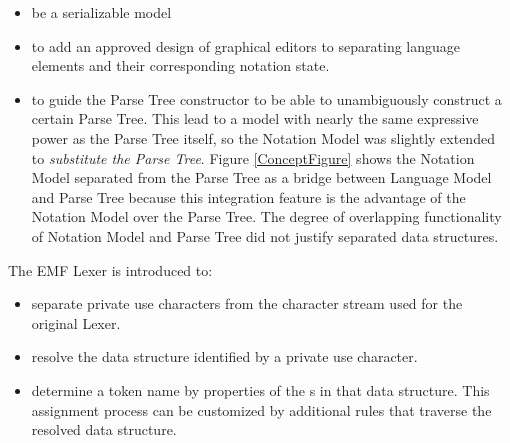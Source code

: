 \begin{itemize}
	\item be a serializable model
	\item to add an approved design of graphical editors to separating language elements and their corresponding notation state.
	\item to guide the Parse Tree constructor to be able to unambiguously construct a certain Parse Tree. This lead to a model with nearly the same expressive power as the Parse Tree itself, so the Notation Model was slightly extended to \emph{substitute the Parse Tree}. Figure \ref{ConceptFigure} shows the Notation Model separated from the Parse Tree as a bridge between Language Model and Parse Tree because this integration feature is the advantage of the Notation Model over the Parse Tree. The degree of overlapping functionality of Notation Model and Parse Tree did not justify separated data structures.
\end{itemize} 
The EMF Lexer is introduced to:
\begin{itemize}
	\item separate private use characters from the character stream used for the original Lexer.
	\item resolve the data structure identified by a private use character.
	\item determine a token name by properties of the s in that data structure. This assignment process can be customized by additional rules that traverse the resolved data structure.
\end{itemize}


